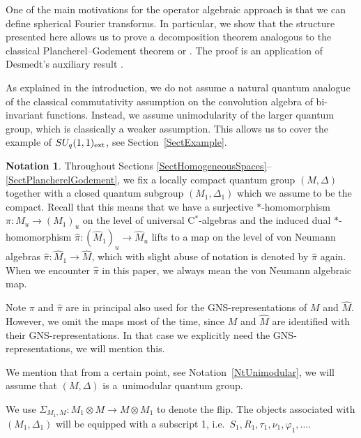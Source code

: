 \documentclass[pdftex]{sigma}
\numberwithin{equation}{section}
\theoremstyle{definition}
\newtheorem{nt}[thm]{Notation}
\begin{document}
One of the main motivations for the operator algebraic approach is that we can def\/ine sphe\-ri\-cal Fourier transforms. In particular, we show that  the structure   presented here allows us to prove a decomposition theorem analogous to the classical Plancherel--Godement theorem  \cite[Th\'eor\`eme~IV.2]{Far} or \cite[Section~6]{Dij}. The proof is an application of Desmedt's auxiliary result \cite[Theorem~3.4.5]{Des}.

As explained in the introduction, we do not assume a natural quantum analogue of the classical commutativity assumption on the convolution algebra of bi-invariant functions. Instead, we assume unimodularity of the larger quantum group, which is classically a weaker assumption. This allows us to cover the example of $SU_q(1,1)_{\rm ext}$, see Section~\ref{SectExample}.


\begin{nt}
Throughout Sections \ref{SectHomogeneousSpaces}--\ref{SectPlancherelGodement}, we f\/ix a locally compact quantum group $(M, \Delta)$ together with a closed quantum subgroup $(M_1,\Delta_1)$ which we assume to be the compact. Recall \cite[Def\/inition~2.9]{VaeVaiLow} that this means that we have a surjective $\ast$-homomorphism $\pi: M_u \rightarrow (M_1)_u$ on the level of universal C$^\ast$-algebras and the induced dual $\ast$-homomorphism $\hat{\pi}: (\hat{M}_1)_u \rightarrow \hat{M}_u$ lifts to a map on the level of von Neumann algebras $\hat{\pi}: \hat{M}_1 \rightarrow \hat{M}$, which with slight abuse of notation is denoted by $\hat{\pi}$ again. When we encounter $\hat{\pi}$ in this paper, we always mean the von Neumann algebraic map.

Note $\pi$ and $\hat{\pi}$ are in principal also used for the GNS-representations of $M$ and $\hat{M}$. However, we omit the maps most of the time, since $M$ and $\hat{M}$ are identif\/ied with their GNS-representations. In that case we explicitly need the GNS-representations, we will mention this.

 We mention that from a certain point, see Notation~\ref{NtUnimodular}, we will assume that $(M, \Delta)$ is a~unimodular quantum group.

We use $\Sigma_{M_1, M}: M_1 \otimes M \rightarrow M \otimes M_1$ to denote the f\/lip. The objects associated with $(M_1, \Delta_1)$ will be equipped with a subscript 1, i.e.\ $S_1, R_1, \tau_1, \nu_1, \varphi_1, \ldots$.
\end{nt}
\end{document}

